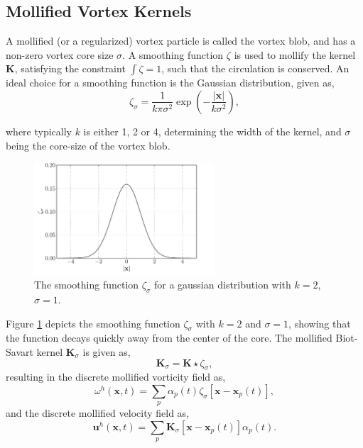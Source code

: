 \subsection{Mollified Vortex Kernels}
\label{subsec:mvk}
A mollified (or a regularized) vortex particle is called the vortex blob, and has a non-zero vortex core size $\sigma$. A smoothing function $\zeta$ is used to mollify the kernel $\mathbf{K}$, satisfying the constraint $\int \zeta = 1$, such that the circulation is conserved. An ideal choice for a smoothing function is the Gaussian distribution, given as,
	\begin{equation}
	\zeta_{\sigma} = \frac{1}{k\pi\sigma^2}\exp\left(-\frac{\left|\mathbf{x}\right|}{k\sigma^2}\right),
	\end{equation}

where typically $k$ is either 1, 2 or 4, determining the width of the kernel, and $\sigma$ being the core-size of the vortex blob.
	\begin{figure}[!b]
	\centering
	\includegraphics[width=0.6\textwidth]{figures/lagrangian/gaussianKernel.pdf}
	\caption{The smoothing function $\zeta_{\sigma}$ for a gaussian distribution with $k=2$, $\sigma=1$.}
	\label{fig:gaussianDistribution}
	\end{figure}

Figure \ref{fig:gaussianDistribution} depicts the smoothing function $\zeta_{\sigma}$ with $k=2$ and $\sigma = 1$, showing that the function decays quickly away from the center of the core. The mollified Biot-Savart kernel $\mathbf{K}_{\sigma}$ is given as,	 
	\begin{equation}
	\mathbf{K}_{\sigma} = \mathbf{K} \star \zeta_{\sigma}, 
	\end{equation}
resulting in the discrete mollified vorticity field as,
	\begin{equation}
	\omega^h\left(\mathbf{x},t\right) = \sum_p \alpha_p\left(t\right)\zeta_{\sigma}\left[\mathbf{x}-\mathbf{x}_p\left(t\right)\right],
	\label{eq:mollifiedVorticityField}
	\end{equation}
and the discrete mollified velocity field as,
	\begin{equation}
	\mathbf{u}^h\left(\mathbf{x},t\right) = \sum_p \mathbf{K}_{\sigma}\left[\mathbf{x}-\mathbf{x}_p\left(t\right)\right]\alpha_p\left(t\right).
	\label{eq:mollifiedVelocityField}	
	\end{equation}

